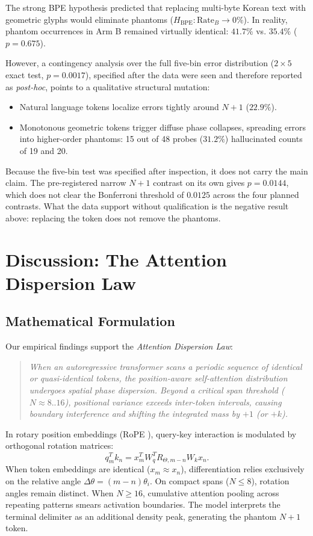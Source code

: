\documentclass[11pt,a4paper]{article}
\begin{document}
The strong BPE hypothesis predicted that replacing multi-byte Korean text with geometric glyphs would eliminate phantoms ($H_{\text{BPE}}: \text{Rate}_B \to 0\%$). In reality, phantom occurrences in Arm B remained virtually identical: \textbf{$41.7\%$} vs. \textbf{$35.4\%$} ($p = 0.675$).

However, a contingency analysis over the full five-bin error distribution ($2 \times 5$ exact test, $p = 0.0017$), specified after the data were seen and therefore reported as \emph{post-hoc}, points to a qualitative structural mutation:
\begin{itemize}
    \item Natural language tokens localize errors tightly around $N+1$ ($22.9\%$).
    \item Monotonous geometric tokens trigger diffuse phase collapses, spreading errors into higher-order phantoms: 15 out of 48 probes ($31.2\%$) hallucinated counts of 19 and 20.
\end{itemize}

Because the five-bin test was specified after inspection, it does not carry the main claim. The pre-registered narrow $N+1$ contrast on its own gives $p = 0.0144$, which does not clear the Bonferroni threshold of $0.0125$ across the four planned contrasts.
What the data support without qualification is the negative result above: replacing the token does not remove the phantoms.

\section{Discussion: The Attention Dispersion Law}
\label{sec:dispersion}

\subsection{Mathematical Formulation}

Our empirical findings support the \textit{Attention Dispersion Law}:
\begin{quote}
\textit{When an autoregressive transformer scans a periodic sequence of identical or quasi-identical tokens, the position-aware self-attention distribution undergoes spatial phase dispersion. Beyond a critical span threshold ($N \approx 8..16$), positional variance exceeds inter-token intervals, causing boundary interference and shifting the integrated mass by $+1$ (or $+k$).}
\end{quote}

In rotary position embeddings (RoPE \cite{su2024roformer}), query-key interaction is modulated by orthogonal rotation matrices:
\begin{equation}
    q_m^T k_n = x_m^T W_q^T R_{\Theta, m-n} W_k x_n.
\end{equation}
When token embeddings are identical ($x_m \approx x_n$), differentiation relies exclusively on the relative angle $\Delta \theta = (m - n)\theta_i$. On compact spans ($N \le 8$), rotation angles remain distinct. When $N \ge 16$, cumulative attention pooling across repeating patterns smears activation boundaries. The model interprets the terminal delimiter as an additional density peak, generating the phantom $N+1$ token.
\end{document}
